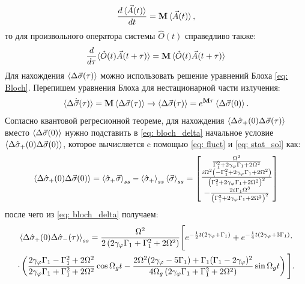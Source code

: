 \begin{equation}
\frac{d\braket{\vec{A}(t)}}{dt} = \mathbf{M}\braket{\vec{A}(t)},
\end{equation}
то для произвольного оператора системы $\hat{O}(t)$ справедливо также:
\begin{equation}
\frac{d}{d\tau}\!\braket{\hat{O}(t)\vec{A}(t+\tau)} = \mathbf{M}\braket{\hat{O}(t)\vec{A}(t+\tau)}
\end{equation}
Для нахождения $\braket{\Delta\vec{\sigma}(\tau)}$ можно использовать решение уравнений Блоха \eqref{eq: Bloch}. Перепишем уравнения Блоха для нестационарной части излучения:
\begin{equation}
\braket{\Delta\dot{\vec{\sigma}}(\tau)} = \mathbf{M}\braket{\Delta\vec{\sigma}(\tau)} \rightarrow \braket{\Delta\vec{\sigma}(\tau)} = e^{\mathbf{M}\tau}\braket{\Delta\vec{\sigma}(0)} %
\label{eq: bloch_delta}.
\end{equation}
Согласно квантовой регресионной теореме, для нахождения $\braket{\Delta\hat{\sigma}_+(0)\Delta\vec{\sigma}(\tau)}$ вместо $\braket{\Delta\vec{\sigma}(0)}$ нужно подставить в \eqref{eq: bloch_delta} начальное условие $\braket{\Delta\hat{\sigma}_+(0)\Delta\vec{\sigma}(0)}$, которое вычисляется c помощью \eqref{eq: fluct} и \eqref{eq: stat_sol} как: 
\begin{equation}
\braket{\Delta\hat{\sigma}_+(0)\Delta\vec{\sigma}(0)} = \braket{\hat{\sigma}_+\vec{\sigma}}_{ss} - \braket{\hat{\sigma}_+}_{ss}\braket{\vec{\sigma}}_{ss}=
\left[\begin{matrix}
\frac{\Omega ^2}{\Gamma_1 ^2+2 \gamma_\varphi  \Gamma_1 +2 \Omega ^2} \\
\frac{i \Omega ^2 \left(-\Gamma_1 ^2+2 \gamma_\varphi  \Gamma_1 +2 \Omega ^2\right)}{\left(\Gamma_1 ^2+2 \gamma_\varphi  \Gamma_1 +2 \Omega ^2\right)^2} \\
-\frac{2 i \Gamma_1  \Omega ^3}{\left(\Gamma_1 ^2+2 \gamma_\varphi  \Gamma_1 +2 \Omega ^2\right)^2} 
\end{matrix}\right]
\end{equation}
после чего из \eqref{eq: bloch_delta} получаем:
\begin{multline}
\braket{\Delta\hat{\sigma}_+(0)\Delta\hat{\sigma}_-(\tau)}_{ss} = \frac{\Omega ^2}{2 \left(2 \gamma_\varphi  \Gamma_1 +\Gamma_1 ^2+2
	\Omega ^2\right)} \Bigg[e^{-\frac{1}{2} t (2 \gamma_\varphi +\Gamma_1 )} + e^{-\frac{1}{4} t (2 \gamma_\varphi +3 \Gamma_1 )} \cdot \\ \cdot \left( \frac{2 \gamma_\varphi  \Gamma_1 -\Gamma_1 ^2+2 \Omega ^2}{2 \gamma_\varphi  \Gamma_1 +\Gamma_1 ^2+2
	\Omega ^2}
		\cos \Omega _g t - \frac{ 2 \Omega ^2 (2 \gamma_\varphi -5 \Gamma_1 )+\Gamma_1  (\Gamma_1 -2 \gamma_\varphi )^2}{4\Omega_g\left(2 \gamma_\varphi  \Gamma_1 +\Gamma_1 ^2+2
			\Omega ^2\right)} \sin \Omega _g  t \right)\Bigg].
\label{eq: Corr(t)}
\end{multline}

